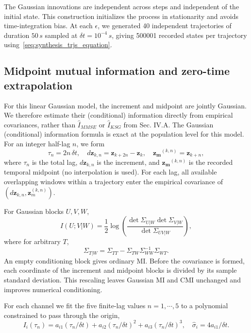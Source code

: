 \documentclass[
 longbibliography,
 twocolumn,
 superscriptaddress,
 amsmath,
 amssymb,
 amsthm,
 amsfonts,
 prl,
 floatfix,
]{revtex4-2}
\newcommand{\matbf}[1]{\boldsymbol{\mathsf{#1}}}
\begin{document}
\begin{widetext}
The Gaussian innovations are independent across steps and independent of the initial state. This construction initializes the process in stationarity and avoids time-integration bias. At each $\epsilon$, we generated 40 independent trajectories of duration $50\,s$ sampled at $\delta t=10^{-4} \,s$, giving 500001 recorded states per trajectory using~\eqref{seq:synthesis_trjs_equation}.

\subsection{Midpoint mutual information and zero-time extrapolation}
\vspace*{-0.6\baselineskip}

For this linear Gaussian model, the increment and midpoint are jointly Gaussian. We therefore estimate their (conditional) information directly from empirical covariances, rather than $\hat I_{MMSE}$ or $\hat I_{KSG}$ from Sec. IV.A. The Gaussian (conditional) information formula is exact at the population level for this model. For an integer half-lag $n$, we form
\[
    \tau_n=2n\,\delta t,
    \quad
    d\bm z_{k,n}=\bm z_{k+2n}-\bm z_k,
    \quad
    \bm {z_m}^{(k,n)}=\bm z_{k+n},
\]
where $\tau_n$ is the total lag, $d\bm z_{k,n}$ is the increment, and $\bm {z_m}^{(k,n)}$ is the recorded temporal midpoint (no interpolation is used). For each lag, all available overlapping windows within a trajectory enter the empirical covariance of $\left(d\bm z_{k,n},\bm z_m^{(k,n)}\right)$.

For Gaussian blocks $U,V,W$,
\begin{equation*}
    I(U;V|W)=\frac{1}{2}\log\left(\frac{\det\matbf\Sigma_{U|W}\det\matbf\Sigma_{V|W}}{\det\matbf\Sigma_{UV|W}}\right),
\end{equation*}
where for arbitrary $T$,
\begin{equation*}
    \matbf\Sigma_{T|W}=\matbf\Sigma_{TT}-\matbf\Sigma_{TW}\matbf\Sigma_{WW}^{-1}\matbf\Sigma_{WT}.
\end{equation*}
An empty conditioning block gives ordinary MI. Before the covariance is formed, each coordinate of the increment and midpoint blocks is divided by its sample standard deviation. This rescaling leaves Gaussian MI and CMI unchanged and improves numerical conditioning. 

For each channel we fit the five finite-lag values $n=1,\cdots,5$ to a polynomial constrained to pass through the origin,
\begin{equation}
    I_i(\tau_n)=a_{i1}(\tau_n/\delta t)+a_{i2}(\tau_n/\delta t)^2+a_{i3}(\tau_n/\delta t)^3,
    \quad
    \hat\sigma_i=4 a_{i1}/\delta t.
    \label{seq:W5-cubic}
\end{equation}


\end{widetext}
\end{document}
